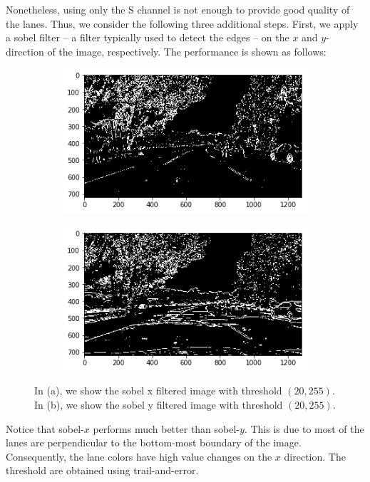 \documentclass[draftcls,onecolumn,12pt]{IEEEtran}
\theoremstyle{plain}
\theoremstyle{plain}
\begin{document}
Nonetheless, using only the S channel is not enough to provide good quality of the lanes. Thus, we consider the following three additional steps. First, we apply a sobel filter -- a filter typically used to detect the edges -- on the $x$ and $y$-direction of the image, respectively. The performance is shown as follows: 
\begin{figure}[htb!!]
    \centering
   \begin{subfigure}[t]{0.45\textwidth}
        \includegraphics[width=\textwidth]{./figures/sobelx.png}\\
        \caption{}
    \end{subfigure}
    \hspace{-0.5cm}
    \begin{subfigure}[t]{0.45\textwidth}
        \includegraphics[width=\textwidth]{./figures/sobely.png}\\
        \caption{}
    \end{subfigure}
    \caption{In (a), we show the sobel x filtered image with threshold $(20, 255)$. In (b), we show the sobel y filtered image with threshold $(20, 255).$}\label{Fig:Sobel}
\end{figure}
Notice that sobel-$x$ performs much better than sobel-$y.$ This is due to most of the lanes are perpendicular to the bottom-most boundary of the image. Consequently, the lane colors have high value changes on the $x$ direction. The threshold are obtained using trail-and-error.
\end{document}
